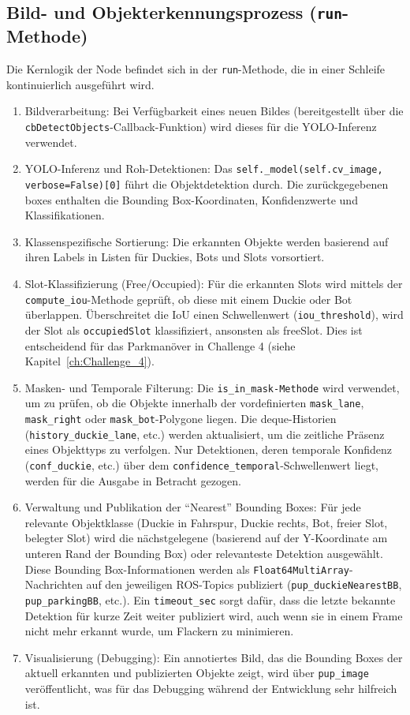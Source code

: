 \subsection{Bild- und Objekterkennungsprozess (\texttt{run}-Methode)}
Die Kernlogik der Node befindet sich in der \texttt{run}-Methode, die in einer Schleife kontinuierlich ausgeführt wird.
\begin{enumerate}
    \item Bildverarbeitung: Bei Verfügbarkeit eines neuen Bildes (bereitgestellt über die \texttt{cbDetectObjects}-Callback-Funktion) wird dieses für die YOLO-Inferenz verwendet.
    \item YOLO-Inferenz und Roh-Detektionen: Das \texttt{self.\_model(self.cv\_image, verbose=False)[0]} führt die Objektdetektion durch. Die zurückgegebenen boxes enthalten die Bounding Box-Koordinaten, Konfidenzwerte und Klassifikationen.
    \item Klassenspezifische Sortierung: Die erkannten Objekte werden basierend auf ihren Labels in Listen für Duckies, Bots und Slots vorsortiert.
    \item Slot-Klassifizierung (Free/Occupied): Für die erkannten Slots wird mittels der \texttt{compute\_iou}-Methode geprüft, ob diese mit einem Duckie oder Bot überlappen. Überschreitet die \ac{IoU} einen Schwellenwert (\texttt{iou\_threshold}), wird der Slot als \texttt{occupiedSlot} klassifiziert, ansonsten als freeSlot. Dies ist entscheidend für das Parkmanöver in Challenge 4 (siehe Kapitel~\ref{ch:Challenge_4}).
    \item Masken- und Temporale Filterung: Die \texttt{is\_in\_mask-Methode} wird verwendet, um zu prüfen, ob die Objekte innerhalb der vordefinierten \texttt{mask\_lane}, \texttt{mask\_right} oder \texttt{mask\_bot}-Polygone liegen. Die deque-Historien (\texttt{history\_duckie\_lane}, etc.) werden aktualisiert, um die zeitliche Präsenz eines Objekttyps zu verfolgen. Nur Detektionen, deren temporale Konfidenz (\texttt{conf\_duckie}, etc.) über dem \texttt{confidence\_temporal}-Schwellenwert liegt, werden für die Ausgabe in Betracht gezogen.
    \item Verwaltung und Publikation der \enquote{Nearest} Bounding Boxes: Für jede relevante Objektklasse (Duckie in Fahrspur, Duckie rechts, Bot, freier Slot, belegter Slot) wird die nächstgelegene (basierend auf der Y-Koordinate am unteren Rand der Bounding Box) oder relevanteste Detektion ausgewählt. Diese Bounding Box-Informationen werden als \texttt{Float64MultiArray}-Nachrichten auf den jeweiligen \ac{ROS}-Topics publiziert (\texttt{pup\_duckieNearestBB}, \texttt{pup\_parkingBB}, etc.). Ein \texttt{timeout\_sec} sorgt dafür, dass die letzte bekannte Detektion für kurze Zeit weiter publiziert wird, auch wenn sie in einem Frame nicht mehr erkannt wurde, um Flackern zu minimieren.
    \item Visualisierung (Debugging): Ein annotiertes Bild, das die Bounding Boxes der aktuell erkannten und publizierten Objekte zeigt, wird über \texttt{pup\_image} veröffentlicht, was für das Debugging während der Entwicklung sehr hilfreich ist.
\end{enumerate}

